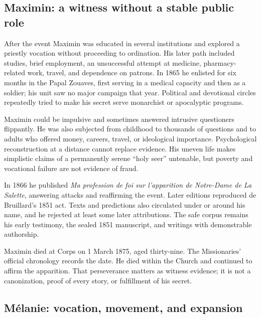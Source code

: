 
\subsection{Maximin: a witness without a stable public role}

After the event Maximin was educated in several institutions and explored a priestly vocation without proceeding to ordination. His later path included studies, brief employment, an unsuccessful attempt at medicine, pharmacy-related work, travel, and dependence on patrons. In 1865 he enlisted for six months in the Papal Zouaves, first serving in a medical capacity and then as a soldier; his unit saw no major campaign that year. Political and devotional circles repeatedly tried to make his secret serve monarchist or apocalyptic programs.

Maximin could be impulsive and sometimes answered intrusive questioners flippantly. He was also subjected from childhood to thousands of questions and to adults who offered money, careers, travel, or ideological importance. Psychological reconstruction at a distance cannot replace evidence. His uneven life makes simplistic claims of a permanently serene ``holy seer'' untenable, but poverty and vocational failure are not evidence of fraud.

In 1866 he published \emph{Ma profession de foi sur l'apparition de Notre-Dame de La Salette}, answering attacks and reaffirming the event. Later editions reproduced de Bruillard's 1851 act. Texts and predictions also circulated under or around his name, and he rejected at least some later attributions. The safe corpus remains his early testimony, the sealed 1851 manuscript, and writings with demonstrable authorship.

Maximin died at Corps on 1 March 1875, aged thirty-nine. The Missionaries' official chronology records the date. He died within the Church and continued to affirm the apparition. That perseverance matters as witness evidence; it is not a canonization, proof of every story, or fulfillment of his secret.

\subsection{Mélanie: vocation, movement, and expansion}

